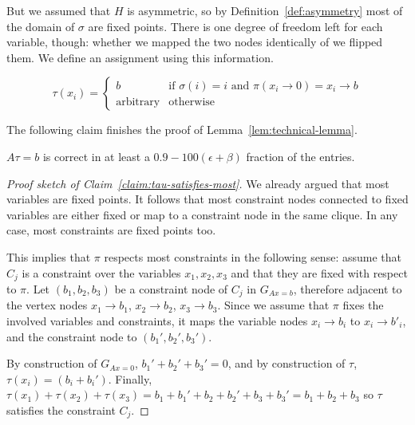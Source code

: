 \documentclass[a4paper,twoside,justified]{tufte-handout}
\newcommand{\Glin}[1]{G_{Ax=#1}}
\begin{document}
But we assumed that $H$ is asymmetric, so by Definition~\ref{def:asymmetry} most of the domain of $\sigma$ are fixed points. There is one degree of freedom left for each variable, though: whether we mapped the two nodes identically of we flipped them. We define an assignment using this information.

\begin{equation}
  \label{eq:define-tau}
  \tau(x_i)=
\begin{cases}
  b &\text{if $\sigma(i)=i$ and $\pi(x_i\to 0)=x_i\to b$}\\
  \text{arbitrary} &\text{otherwise}
\end{cases}
\end{equation}

The following claim finishes the proof of Lemma~\ref{lem:technical-lemma}.

\begin{claim}
  \label{claim:tau-satisfies-most}
  $A\tau = b$ is correct in at least a $0.9-100(\epsilon + \beta)$ fraction of the entries.
\end{claim}
\begin{proof}[Proof sketch of Claim~\ref{claim:tau-satisfies-most}]

We already argued that most variables are fixed points. It follows that most constraint nodes connected to fixed variables are either fixed or map to a constraint node in the same clique. In any case, most constraints are fixed points too.

This implies that $\pi$ respects most constraints in the following sense: assume that $C_j$ is a constraint over the variables $x_1,x_2,x_3$ and that they are fixed with respect to $\pi$. Let $(b_1,b_2,b_3)$ be a constraint node of $C_j$ in $\Glin{b}$, therefore adjacent to the vertex nodes $x_1\to b_1$, $x_2\to b_2$, $x_3 \to b_3$. Since we assume that $\pi$ fixes the involved variables and constraints, it maps the variable nodes $x_i\to b_i$ to $x_i \to b'_i$, and the constraint node to $(b_1',b_2',b_3')$.

By construction of $\Glin{0}$, $b_1'+b_2'+b_3'=0$, and by construction of $\tau$, $\tau(x_i)=(b_i + b_i')$. Finally, $\tau(x_1)+\tau(x_2)+\tau(x_3) = b_1 + b_1' + b_2 + b_2' + b_3 + b_3' = b_1 + b_2 + b_3$ so $\tau$ satisfies the constraint $C_j$.

\end{proof}



\end{document}
